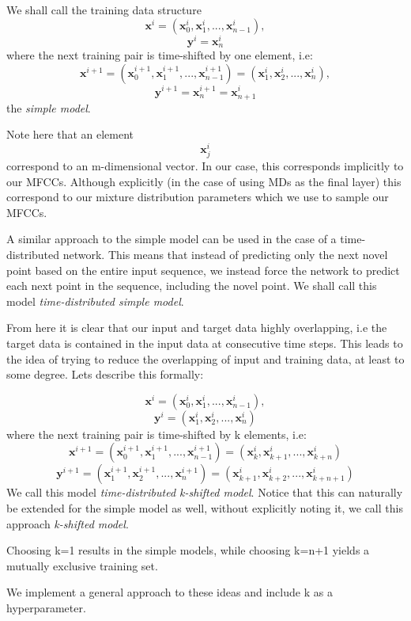 \documentclass[conference]{IEEEtran}
\begin{document}
We shall call the training data structure 
\[ \textbf{x}^i = (\textbf{x}_0^i, \textbf{x}_1^i, ..., \textbf{x}_{n-1}^i), \] 
\[\textbf{y}^i = \textbf{x}_n^i\] 
where the next training pair is time-shifted by one element, i.e:
\[ \textbf{x}^{i+1} = (\textbf{x}_0^{i+1}, \textbf{x}_1^{i+1}, ..., \textbf{x}_{n-1}^{i+1}) = (\textbf{x}_1^i, \textbf{x}_2^i, ..., \textbf{x}_n^i),\]
\[ \textbf{y}^{i+1} = \textbf{x}_n^{i+1} = \textbf{x}_{n+1}^i\] 
the \textit{simple model}. 

Note here that an element 
\[\textbf{x}_{j}^i\] 
correspond to an m-dimensional vector. In our case, this corresponds implicitly to our MFCCs. Although explicitly (in the case of using MDs as the final layer) this correspond to our mixture distribution parameters which we use to sample our MFCCs.

A similar approach to the simple model can be used in the case of a time-distributed network. This means that instead of predicting only the next novel point based on the entire input sequence, we instead force the network to predict each next point in the sequence, including the novel point. We shall call this model \textit{time-distributed simple model}.

From here it is clear that our input and target data highly overlapping, i.e the target data is contained in the input data at consecutive time steps. This leads to the idea of trying to reduce the overlapping of input and training data, at least to some degree. Lets describe this formally:

\[ \textbf{x}^i = (\textbf{x}_0^i, \textbf{x}_1^i, ..., \textbf{x}_{n-1}^i), \] 
\[\textbf{y}^i = (\textbf{x}_1^i, \textbf{x}_2^i, ..., \textbf{x}_n^i)\] 
where the next training pair is time-shifted by k elements, i.e:
\[ \textbf{x}^{i+1} = (\textbf{x}_0^{i+1}, \textbf{x}_1^{i+1}, ..., \textbf{x}_{n-1}^{i+1}) = (\textbf{x}_k^i, \textbf{x}_{k+1}^i, ..., \textbf{x}_{k+n}^i)\]
\[ \textbf{y}^{i+1} = (\textbf{x}_1^{i+1}, \textbf{x}_2^{i+1}, ..., \textbf{x}_n^{i+1}) =(\textbf{x}_{k+1}^i, \textbf{x}_{k+2}^i, ..., \textbf{x}_{k+n+1}^i)\]
We call this model \textit{time-distributed k-shifted model}. Notice that this can naturally be extended for the simple model as well, without explicitly noting it, we call this approach \textit{k-shifted model}.

Choosing k=1 results in the simple models, while choosing k=n+1 yields a mutually exclusive training set.

We implement a general approach to these ideas and include k as a hyperparameter.
\end{document}
